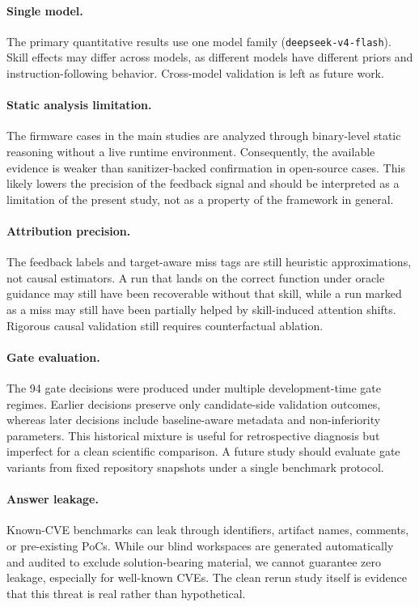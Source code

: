 ﻿\documentclass[preprint,12pt]{elsarticle}
\begin{document}
\paragraph{Single model.}
The primary quantitative results use one model family
(\texttt{deepseek-v4-flash}).  Skill effects may differ across models, as
different models have different priors and instruction-following behavior.
Cross-model validation is left as future work.

\paragraph{Static analysis limitation.}
The firmware cases in the main studies are analyzed through binary-level
static reasoning without a live runtime environment.  Consequently, the
available evidence is weaker than sanitizer-backed confirmation in
open-source cases.  This likely lowers the precision of the feedback signal
and should be interpreted as a limitation of the present study, not as a
property of the framework in general.

\paragraph{Attribution precision.}
The feedback labels and target-aware miss tags are still heuristic
approximations, not causal estimators.  A run that lands on the correct
function under oracle guidance may still have been recoverable without that
skill, while a run marked as a miss may still have been partially helped by
skill-induced attention shifts.  Rigorous causal validation still requires
counterfactual ablation.

\paragraph{Gate evaluation.}
The 94 gate decisions were produced under multiple development-time gate
regimes.  Earlier decisions preserve only candidate-side validation
outcomes, whereas later decisions include baseline-aware metadata and
non-inferiority parameters.  This historical mixture is useful for
retrospective diagnosis but imperfect for a clean scientific comparison.  A
future study should evaluate gate variants from fixed repository snapshots
under a single benchmark protocol.

\paragraph{Answer leakage.}
Known-CVE benchmarks can leak through identifiers, artifact names,
comments, or pre-existing PoCs.  While our blind workspaces are generated
automatically and audited to exclude solution-bearing material, we cannot
guarantee zero leakage, especially for well-known CVEs.  The clean rerun
study itself is evidence that this threat is real rather than hypothetical.
\end{document}
